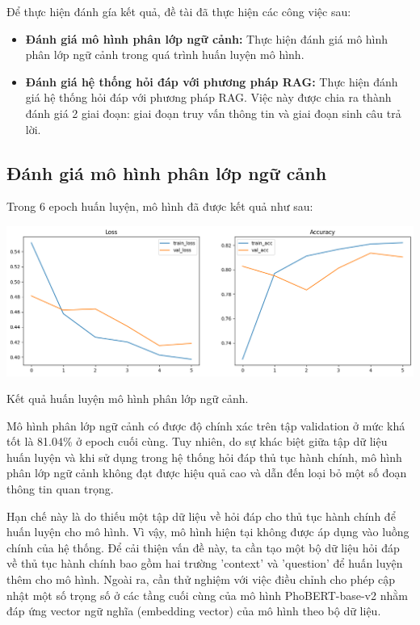 \documentclass[a4paper, 12pt, openany]{book}
\begin{document}
Để thực hiện đánh gía kết quả, đề tài đã thực hiện các công việc sau:
\begin{itemize}
    \item \textbf{Đánh giá mô hình phân lớp ngữ cảnh:} Thực hiện đánh giá mô hình phân lớp ngữ cảnh trong quá trình huấn luyện mô hình.
    \item \textbf{Đánh giá hệ thống hỏi đáp với phương pháp RAG:} Thực hiện đánh giá hệ thống hỏi đáp với phương pháp RAG. Việc này được chia
    ra thành đánh giá 2 giai đoạn: giai đoạn truy vấn thông tin và giai đoạn sinh câu trả lời.
\end{itemize}

\subsection{Đánh giá mô hình phân lớp ngữ cảnh}

Trong 6 epoch huấn luyện, mô hình đã được kết quả như sau:

\begin{minipage}{\linewidth}
    \centering
    \includegraphics[width=\linewidth]{./assets/images/training-result.png}
    \captionsetup{type=figure}
    \caption{Kết quả huấn luyện mô hình phân lớp ngữ cảnh.}
\end{minipage}
\vspace{0.5cm}

Mô hình phân lớp ngữ cảnh có được độ chính xác trên tập validation ở mức khá tốt là 81.04\% ở epoch cuối cùng.
Tuy nhiên, do sự khác biệt giữa tập dữ liệu huấn luyện và khi sử dụng trong hệ thống hỏi đáp thủ tục hành chính, 
mô hình phân lớp ngữ cảnh không đạt được hiệu quả cao và dẫn đến loại bỏ một số đoạn thông tin quan trọng.

Hạn chế này là do thiếu một tập dữ liệu về hỏi đáp cho thủ tục hành chính để huấn luyện cho mô hình. Vì vậy, mô hình hiện tại không được
áp dụng vào luồng chính của hệ thống. Để cải thiện vấn đề này, ta cần tạo một bộ dữ liệu hỏi đáp về thủ tục hành chính bao gồm hai trường 'context' và 'question'
để huấn luyện thêm cho mô hình. Ngoài ra, cần thử nghiệm với việc điều chỉnh cho phép cập nhật một số trọng số ở các tầng cuối cùng của mô hình PhoBERT-base-v2 nhằm đáp ứng
vector ngữ nghĩa (embedding vector) của mô hình theo bộ dữ liệu.
\end{document}
